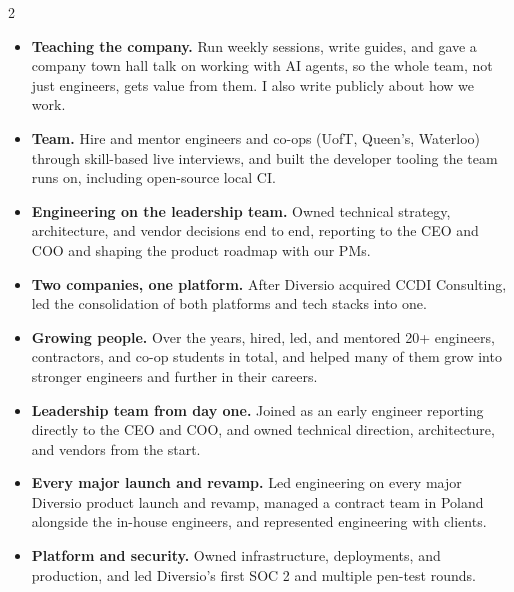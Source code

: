 \documentclass[10pt,a4paper,withhyper,ragged2e]{altacv}
\begin{document}
\begin{paracol}{2}
\begin{itemize}
\item \textbf{Teaching the company.} Run weekly sessions, write guides, and gave a company town hall talk on working with AI agents, so the whole team, not just engineers, gets value from them. I also write publicly about how we work.
\item \textbf{Team.} Hire and mentor engineers and co-ops (UofT, Queen's, Waterloo) through skill-based live interviews, and built the developer tooling the team runs on, including open-source local CI.
\end{itemize}

\divider

\begin{itemize}
\item \textbf{Engineering on the leadership team.} Owned technical strategy, architecture, and vendor decisions end to end, reporting to the CEO and COO and shaping the product roadmap with our PMs.
\item \textbf{Two companies, one platform.} After Diversio acquired CCDI Consulting, led the consolidation of both platforms and tech stacks into one.
\item \textbf{Growing people.} Over the years, hired, led, and mentored 20+ engineers, contractors, and co-op students in total, and helped many of them grow into stronger engineers and further in their careers.
\end{itemize}

\divider

\begin{itemize}
\item \textbf{Leadership team from day one.} Joined as an early engineer reporting directly to the CEO and COO, and owned technical direction, architecture, and vendors from the start.
\item \textbf{Every major launch and revamp.} Led engineering on every major Diversio product launch and revamp, managed a contract team in Poland alongside the in-house engineers, and represented engineering with clients.
\item \textbf{Platform and security.} Owned infrastructure, deployments, and production, and led Diversio's first SOC 2 and multiple pen-test rounds.
\end{itemize}


\end{paracol}
\end{document}
